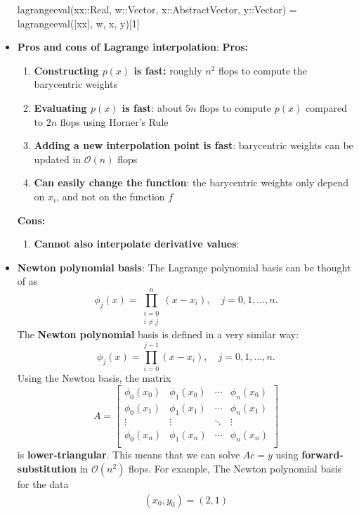 \documentclass{report}
\begin{document}
\begin{itemize}
\begin{jlcode}
lagrangeeval(xx::Real, w::Vector, x::AbstractVector, y::Vector) = lagrangeeval([xx], w, x, y)[1]
    \end{jlcode}
\item \textbf{Pros and cons of Lagrange interpolation}:
    \textbf{Pros:}
    \begin{enumerate}
        \item \textbf{Constructing $p(x)$ is fast:} roughly $n^2$ flops to compute the barycentric weights
        \item \textbf{Evaluating $p(x)$ is fast}: about $5n$ flops to compute $p(x)$ compared to $2n$ flops using Horner's Rule
        \item \textbf{Adding a new interpolation point is fast}: barycentric weights can be updated in $\mathcal{O}(n)$ flops
        \item \textbf{Can easily change the function}: the barycentric weights only depend on $x_i$, and not on the function $f$
    \end{enumerate}
    \textbf{Cons:}
    \begin{enumerate}
        \item \textbf{Cannot also interpolate derivative values}:
    \end{enumerate}
\item \textbf{Newton polynomial basis}: The Lagrange polynomial basis can be thought of as
    $$
    \phi_j(x) = \prod_{\substack{i = 0 \\ i \neq j}}^n (x - x_i), 
    \quad j = 0,1,\ldots,n.
    $$
    The \textbf{Newton polynomial} basis is defined in a very similar way:
    $$
    \phi_j(x) = \prod_{i = 0}^{j-1} (x - x_i), 
    \quad j = 0,1,\ldots,n.
    $$
    \bigbreak \noindent 
    Using the Newton basis, the matrix
    $$
    A = 
    \begin{bmatrix}
        \phi_0(x_0) & \phi_1(x_0) & \cdots & \phi_n(x_0)\\
        \phi_0(x_1) & \phi_1(x_1) & \cdots & \phi_n(x_1)\\
        \vdots & \vdots & \ddots & \vdots\\
        \phi_0(x_n) & \phi_1(x_n) & \cdots & \phi_n(x_n)\\
    \end{bmatrix}
    $$
    is \textbf{lower-triangular}. This means that we can solve $Ac = y$ using \textbf{forward-substitution} in $\mathcal{O}(n^2)$ flops.
    \bigbreak \noindent 
    For example, The Newton polynomial basis for the data
    \begin{align*}
        (x_0,y_0) = (2,1)\\

\end{align*}
\end{itemize}
\end{document}
